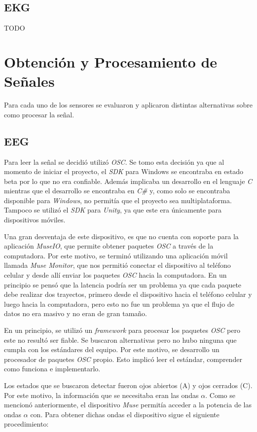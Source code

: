 \subsection{EKG}

TODO

\section{Obtención y Procesamiento de Señales}

Para cada uno de los sensores se evaluaron y aplicaron distintas alternativas sobre como procesar la señal.

\subsection{EEG}

Para leer la señal se decidió utilizó \emph{OSC}. Se tomo esta decisión ya que al momento de iniciar el proyecto, el \emph{SDK} para Windows se encontraba en estado beta por lo que no era confiable. Además implicaba un desarrollo en el lenguaje \emph{C} mientras que el desarrollo se encontraba en \emph{C\#} y, como solo se encontraba disponible para \emph{Windows}, no permitía que el proyecto sea multiplataforma. Tampoco se utilizó el \emph{SDK} para \emph{Unity}, ya que este era únicamente para dispositivos móviles.

Una gran desventaja de este dispositivo, es que no cuenta con soporte para la aplicación \emph{MuseIO}, que permite obtener paquetes \emph{OSC} a través de la computadora. Por este motivo, se terminó utilizando una aplicación móvil llamada \emph{Muse Monitor}, que nos permitió conectar el dispositivo al teléfono celular y desde allí enviar los paquetes \emph{OSC} hacia la computadora. En un principio se pensó que la latencia podría ser un problema ya que cada paquete debe realizar dos trayectos, primero desde el dispositivo hacia el teléfono celular y luego hacia la computadora, pero esto no fue un problema ya que el flujo de datos no era masivo y no eran de gran tamaño.

En un principio, se utilizó un \emph{framework} para procesar los paquetes \emph{OSC} pero este no resultó ser fiable. Se buscaron alternativas pero no hubo ninguna que cumpla con los estándares del equipo. Por este motivo, se desarrollo un procesador de paquetes \emph{OSC} propio. Esto implicó leer el estándar, comprender como funciona e implementarlo.
 
 Los estados que se buscaron detectar fueron ojos abiertos (A) y ojos cerrados (C). Por este motivo, la información que se necesitaba eran las ondas $\alpha$. Como se mencionó anteriormente, el dispositivo \emph{Muse} permitía acceder a la potencia de las ondas $\alpha$ con. Para obtener dichas ondas el dispositivo sigue el siguiente procedimiento:
 
